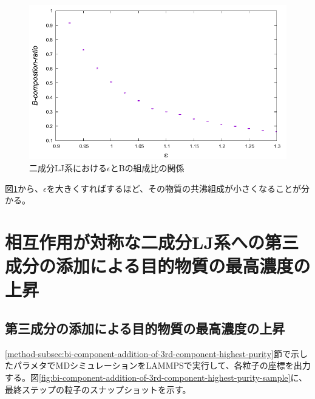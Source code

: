\documentclass[titlepage]{jsreport}
\begin{document}
\begin{figure}[htbp]
    \begin{center}
        \includegraphics[width=14cm]{fig/epsilon-composition_ratio/epsilon-composition_ratio.pdf}
    \end{center}
    \caption{二成分LJ系における$\epsilon$とBの組成比の関係}
    \label{fig:epsilon-composition_ratio}
\end{figure}

図\ref{fig:epsilon-composition_ratio}から、$\epsilon$を大きくすればするほど、その物質の共沸組成が小さくなることが分かる。


\newpage
\section{相互作用が対称な二成分LJ系への第三成分の添加による目的物質の最高濃度の上昇} \label{results-sec:bi-component-addition-of-3rd-component-highest-purity}
\subsection{第三成分の添加による目的物質の最高濃度の上昇} \label{results-subsec:bi-component-addition-of-3rd-component-highest-purity}
\ref{method-subsec:bi-component-addition-of-3rd-component-highest-purity}節で示したパラメタでMDシミュレーションをLAMMPSで実行して、各粒子の座標を出力する。図\ref{fig:bi-component-addition-of-3rd-component-highest-purity-sample}に、最終ステップの粒子のスナップショットを示す。
\end{document}
